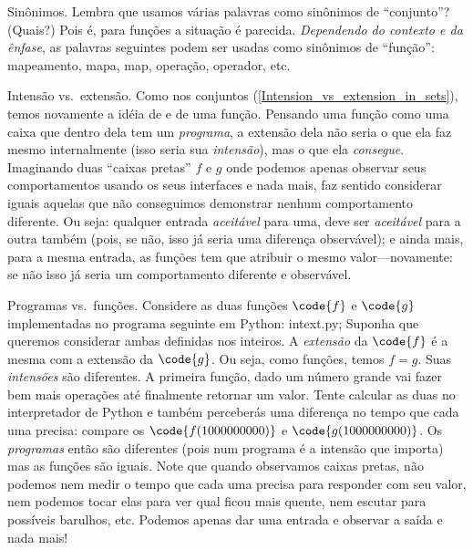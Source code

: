 \note Sinônimos.
%
%
%
%
%
%
%
Lembra que usamos várias palavras como sinônimos de ``conjunto''?
(Quais?)
Pois é, para funções a situação é parecida.
\emph{Dependendo do contexto e da ênfase},
as palavras seguintes podem ser usadas como
sinônimos de ``função'':
mapeamento,
mapa,
map,
operação,
operador,
etc.

\note Intensão vs{.}~extensão.
\label{intension_vs_extension_in_functions}%
Como nos conjuntos (\ref{Intension_vs_extension_in_sets}),
temos novamente a idéia de  e  de uma função.
Pensando uma função como uma caixa que dentro dela tem um \emph{programa},
a extensão dela não seria o que ela faz mesmo internalmente (isso seria sua
\emph{intensão}), mas o que ela \emph{consegue}.
Imaginando duas ``caixas pretas'' $f$ e $g$ onde podemos apenas observar
seus comportamentos usando os seus interfaces e nada mais, faz sentido
considerar iguais aquelas que não conseguimos demonstrar nenhum comportamento diferente.
Ou seja: qualquer entrada \emph{aceitável} para uma, deve ser \emph{aceitável}
para a outra também (pois, se não, isso já seria uma diferença observável);
e ainda mais, para a mesma entrada, as funções tem que atribuir o mesmo
valor---novamente: se não isso já seria um comportamento diferente e
observável.

\note Programas vs.~funções.
\label{programs_vs_functions}%
Considere as duas funções $\code{f}$ e $\code{g}$ implementadas no programa
seguinte em Python:
\sourcecode intext.py;
\endgraf\noindent
Suponha que queremos considerar ambas definidas nos inteiros.
A \emph{extensão} da $\code{f}$ é a mesma com a extensão da $\code{g}$.
Ou seja, como funções, temos $f = g$.
Suas \emph{intensões} são diferentes.
A primeira função, dado um número grande vai fazer bem mais operações até
finalmente retornar um valor.
Tente calcular as duas no interpretador de Python e também perceberás uma diferença
no tempo que cada uma precisa: compare os
$\code{f(1000000000)}$ e $\code{g(1000000000)}$.
Os \emph{programas} então são diferentes (pois num programa é a intensão que importa)
mas as funções são iguais.
Note que quando observamos caixas pretas, não podemos nem medir o tempo que
cada uma precisa para responder com seu valor, nem podemos tocar elas para ver
qual ficou mais quente, nem escutar para possíveis barulhos, etc.
Podemos apenas dar uma entrada e observar a saída e nada mais!

